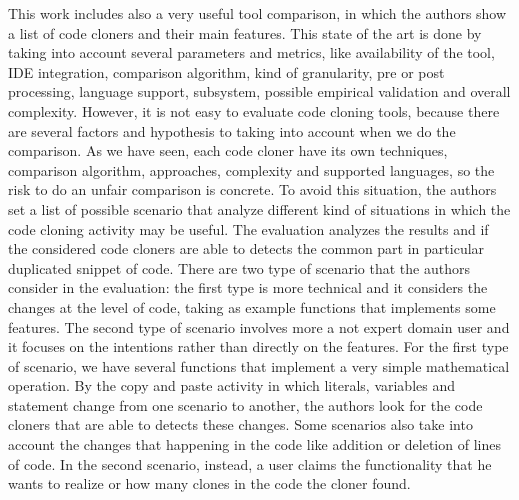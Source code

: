 This work includes also a very useful tool comparison, in which the authors show a list of code cloners and their main features. This state of the art is done by taking into account several parameters and metrics, like availability of the tool, IDE integration, comparison algorithm, kind of granularity, pre or post processing, language support, subsystem, possible empirical validation and overall complexity. However, it is not easy to evaluate code cloning tools, because there are several factors and hypothesis to taking into account when we do the comparison. As we have seen, each code cloner have its own techniques, comparison algorithm, approaches, complexity and supported languages, so the risk to do an unfair comparison is concrete. To avoid this situation, the authors set a list of possible scenario that analyze different kind of situations in which the code cloning activity may be useful. The evaluation analyzes the results and if the considered code cloners are able to detects the common part in particular duplicated snippet of code. There are two type of scenario that the authors consider in the evaluation: the first type is more technical and it considers the changes at the level of code, taking as example functions that implements some features. The second type of scenario involves more a not expert domain user and it focuses on the intentions rather than directly on the features. For the first type of scenario, we have several functions that implement a very simple mathematical operation. By the copy and paste activity in which literals, variables and statement change from one scenario to another, the authors look for the code cloners that are able to detects these changes. Some scenarios also take into account the changes that happening in the code like addition or deletion of lines of code. In the second scenario, instead, a user claims the functionality that he wants to realize or how many clones in the code the cloner found. 
\newline
